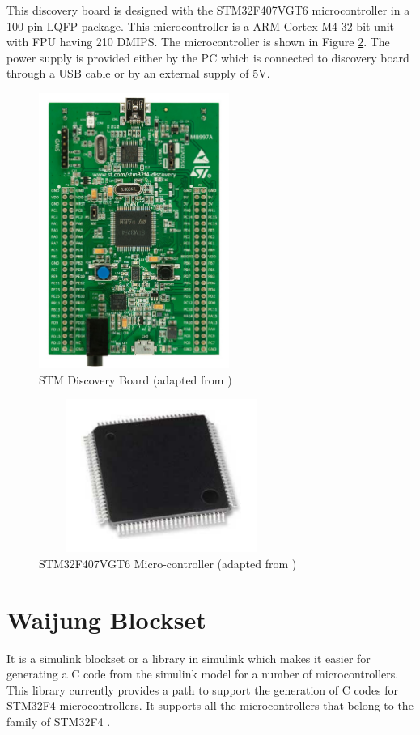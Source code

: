 \documentclass[a4paper,12pt]{iitmdiss}
\begin{document}
This discovery board is designed with the STM32F407VGT6 microcontroller in a 100-pin LQFP package. This microcontroller is a ARM Cortex-M4 32-bit unit with FPU having 210 DMIPS. The microcontroller is shown in Figure \ref{fig:4.2}. The power supply is provided either by the PC which is connected to discovery board through a USB cable or by an external supply of 5V.


\begin{figure}[hbt!]
    \centering
    \includegraphics[height=9cm]{STM board.png}
    \caption{STM Discovery Board (adapted from \textcolor{blue}{\cite{um14722012stm32f4discovery}})}
    \label{fig:4.1}
\end{figure}

\begin{figure}[hbt!]
    \centering
    \includegraphics[width=8cm,height=5cm]{microcontroller.png}
    \caption{STM32F407VGT6 Micro-controller (adapted from \textcolor{blue}{\cite{um14722012stm32f4discovery}})}
    \label{fig:4.2}
\end{figure}

\section{Waijung Blockset}
It is a simulink blockset or a library in simulink which makes it easier for generating a C code from the simulink model for a number of microcontrollers. This library currently provides a path to support the generation of C codes for STM32F4 microcontrollers. It supports all the microcontrollers that belong to the family of STM32F4 \textcolor{blue}{\cite{waijungblockset}}.
\end{document}
